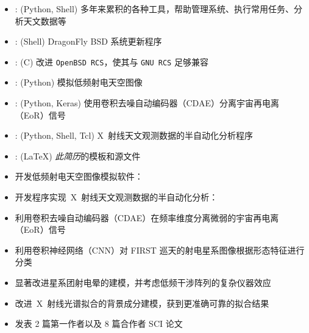 \documentclass[zh]{resume}
\begin{document}
\begin{itemize}
  \item {}:
    (Python, Shell)
    多年来累积的各种工具，帮助管理系统、执行常用任务、分析天文数据等
  \item {}:
    (Shell)
    DragonFly BSD 系统更新程序
  \item {}:
    (C)
    改进 \texttt{OpenBSD RCS}，使其与 \texttt{GNU RCS} 足够兼容
  \item {}:
    (Python)
    模拟低频射电天空图像
  \item {}:
    (Python, Keras)
    使用卷积去噪自动编码器（CDAE）分离宇宙再电离（EoR）信号
  \item {}:
    (Python, Shell, Tcl)
    X~射线天文观测数据的半自动化分析程序
  \item {}:
    (\LaTeX)
    \emph{此简历}的模板和源文件
\end{itemize}

\begin{itemize}
  \item 开发低频射电天空图像模拟软件：
  \item 开发程序实现~X~射线天文观测数据的半自动化分析：
  \item 利用卷积去噪自动编码器（CDAE）在频率维度分离微弱的宇宙再电离（EoR）信号
  \item 利用卷积神经网络（CNN）对 FIRST 巡天的射电星系图像根据形态特征进行分类
  \item 显著改进星系团射电晕的建模，并考虑低频干涉阵列的复杂仪器效应
  \item 改进~X~射线光谱拟合的背景成分建模，获到更准确可靠的拟合结果
  \item 发表 2 篇第一作者以及 8 篇合作者 SCI 论文
\end{itemize}
\end{document}
